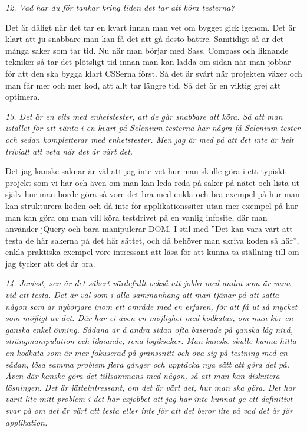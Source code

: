 \documentclass[11pt]{article}
\begin{document}
\emph{12. Vad har du för tankar kring tiden det tar att köra testerna?}

Det är dåligt när det tar en kvart innan man vet om bygget gick igenom. Det är klart att ju snabbare man kan få det att gå desto bättre. Samtidigt så är det många saker som tar tid. Nu när man börjar med Sass, Compass och liknande tekniker så tar det plötsligt tid innan man kan ladda om sidan när man jobbar för att den ska bygga klart CSSerna först. Så det är svårt när projekten växer och man får mer och mer kod, att allt tar längre tid. Så det är en viktig grej att optimera.

\emph{13. Det är en vits med enhetstester, att de går snabbare att köra. Så att man istället för att vänta i en kvart på Selenium-testerna har några få Selenium-tester och sedan kompletterar med enhetstester. Men jag är med på att det inte är helt trivialt att veta när det är värt det.}

Det jag kanske saknar är väl att jag inte vet hur man skulle göra i ett typiskt projekt som vi har och även om man kan leda reda på saker på nätet och lista ut själv hur man borde göra så vore det bra med enkla och bra exempel på hur man kan strukturera koden och då inte för applikationssiter utan mer exempel på hur man kan göra om man vill köra testdrivet på en vanlig infosite, där man använder jQuery och bara manipulerar DOM. I stil med ”Det kan vara värt att testa de här sakerna på det här sättet, och då behöver man skriva koden så här”, enkla praktiska exempel vore intressant att läsa för att kunna ta ställning till om jag tycker att det är bra.

\emph{14. Javisst, sen är det säkert värdefullt också att jobba med andra som är vana vid att testa. Det är väl som i alla sammanhang att man tjänar på att sätta någon som är nybörjare inom ett område med en erfaren, för att få ut så mycket som möjligt av det. Där har vi även en möjlighet med kodkatas, om man kör en ganska enkel övning. Sådana är å andra sidan ofta baserade på ganska låg nivå, strängmanipulation och liknande, rena logiksaker. Man kanske skulle kunna hitta en kodkata som är mer fokuserad på gränssnitt och öva sig på testning med en sådan, lösa samma problem flera gånger och upptäcka nya sätt att göra det på. Även där kanske göra det tillsammans med någon, så att man kan diskutera lösningen. Det är jätteintressant, om det är värt det, hur man ska göra. Det har varit lite mitt problem i det här exjobbet att jag har inte kunnat ge ett definitivt svar på om det är värt att testa eller inte för att det beror lite på vad det är för applikation.}
\end{document}
